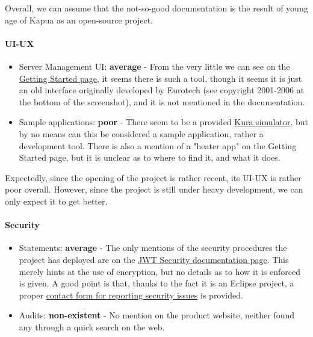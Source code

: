 \documentclass{article}
\begin{document}
Overall, we can assume that the not-so-good documentation is the result of young age of Kapua as an open-source project.

\paragraph{UI-UX}

\begin{itemize}
\item Server Management UI: \textbf{average} - From the very little we can see on the \href{https://www.eclipse.org/kapua/getting-started.php}{Getting Started page}, it seems there is such a tool, though it seems it is just an old interface originally developed by Eurotech (see copyright 2001-2006 at the bottom of the screenshot), and it is not mentioned in the documentation.
\item Sample applications: \textbf{poor} - There seem to be a provided \href{http://download.eclipse.org/kapua/docs/develop/user-manual/en/simulator.html}{Kura simulator}, but by no means can this be considered a sample application, rather a development tool. There is also a mention of a "heater app" on the Getting Started page, but it is unclear as to where to find it, and what it does.
\end{itemize}

Expectedly, since the opening of the project is rather recent, its UI-UX is rather poor overall. However, since the project is still under heavy development, we can only expect it to get better.

\paragraph{Security}

\begin{itemize}
\item Statements: \textbf{average} - The only mentions of the security procedures the project has deployed are on the \href{http://download.eclipse.org/kapua/docs/develop/user-manual/en/jwt_security.html}{JWT Security documentation page}. This merely hints at the use of encryption, but no details as to how it is enforced is given. A good point is that, thanks to the fact it is an Eclipse project, a proper \href{https://github.com/eclipse/kapua/issues}{contact form for reporting security issues} is provided.
\item Audits: \textbf{non-existent} - No mention on the product website, neither found any through a quick search on the web.
\end{itemize}
\end{document}
